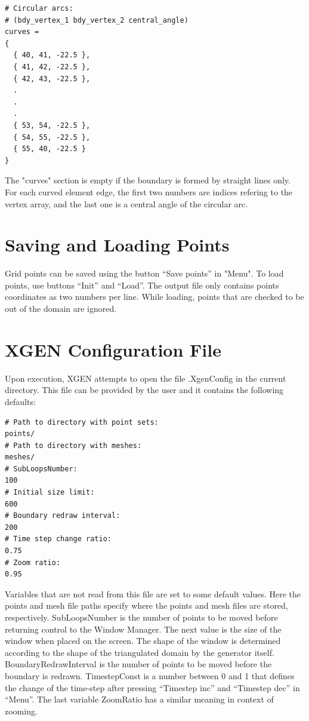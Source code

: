 \documentclass[12pt]{article}
\begin{document}
\begin{verbatim}
# Circular arcs:
# (bdy_vertex_1 bdy_vertex_2 central_angle)
curves =
{
  { 40, 41, -22.5 },
  { 41, 42, -22.5 },
  { 42, 43, -22.5 },
  .
  .
  .
  { 53, 54, -22.5 },
  { 54, 55, -22.5 },
  { 55, 40, -22.5 }
}
  \end{verbatim}
The "curves" section is empty if the boundary is formed by 
straight lines only. For each curved element edge, the 
first two numbers are indices refering to the vertex array, and the 
last one is a central angle of the circular arc.

  \section{Saving and Loading Points}

  Grid points can be saved using the button ``Save points'' in "Menu".
  To load points, use buttons ``Init'' and ``Load''.
  The output file only contains points coordinates as two
  numbers per line. While loading, points that are checked to be
  out of the domain are ignored. 

  \section{XGEN Configuration File}
   
  Upon execution, XGEN attempts to open the file
  .XgenConfig in the current directory. This file 
  can be provided by the user and it contains 
  the following defaults:

  \begin{verbatim} 
# Path to directory with point sets:
points/
# Path to directory with meshes:
meshes/
# SubLoopsNumber:
100
# Initial size limit:
600
# Boundary redraw interval:
200
# Time step change ratio:
0.75
# Zoom ratio:
0.95
  \end{verbatim}
  Variables that are not read from this file are set to some default values.
  Here the points and mesh file paths specify where the points and mesh 
  files are stored, respectively. SubLoopsNumber is the number of
  points to be moved before returning control to the Window Manager.
  The next value is the size of the window when placed on the screen.
  The shape of the window is determined according to the shape
  of the triangulated domain by the generator itself. BoundaryRedrawInterval
  is the number of points to be moved before the boundary is
  redrawn. TimestepConst is a number between 0 and 1 that defines the change of
  the time-step after pressing ``Timestep inc'' and ``Timestep dec'' in ``Menu''.
  The last variable ZoomRatio has a similar meaning in context of zooming.
\end{document}
